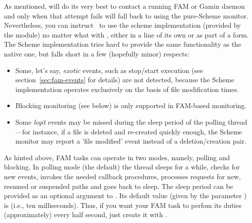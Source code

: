 As mentioned,  will do its very best to contact a
running FAM or Gamin daemon and only when that attempt fails will fall
back to using the pure-Scheme monitor. Nevertheless, you can instruct
\MzFam\ to use the scheme implementation (provided by the 
module) no matter what with , either in a
line of its own or as part of a  form. The Scheme
implementation tries hard to provide the same functionality as the
native one, but falls short in a few (hopefully minor) respects:
\begin{itemize}
\item Some, let's say, \textit{exotic} events, such as stop/start
  execution (see section~\ref{sec:fam-events} for details) are not
  detected, because the Scheme implementation operates exclusively on
  the basis of file modification times.
\item Blocking monitoring (see below) is only supported in FAM-based
  monitoring.
\item Some \textit{legit} events may be missed during the sleep period
  of the polling thread---for instance, if a file is deleted and
  re-created quickly enough, the Scheme monitor may report a 'file
  modified' event instead of a deletion/creation pair.
\end{itemize}

As hinted above, FAM tasks can operate in two modes, namely, polling
and blocking. In polling mode (the default) the thread sleeps for a
while, checks for new events, invokes the needed callback procedures,
processes requests for new, resumed or suspended paths and goes back
to sleep. The sleep period can be provided as an optional argument to
. Its default value (given by the parameter
) is  (i.e., ten milliseconds).
Thus, if you want your FAM task to perfom its duties (approximately)
every half second, just create it with .

